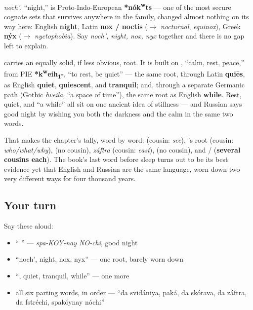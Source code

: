 \begin{cousinweb}
\emph{noch'}, \textquotedblleft{}night,\textquotedblright{} is Proto-Indo-European \textbf{*nók\textsuperscript{w}ts} — one of the most secure cognate sets that survives anywhere in the family, changed almost nothing on its way here: English \textbf{night}, Latin \textbf{nox / noctis} ($\to$ \emph{nocturnal}, \emph{equinox}), Greek \textbf{nýx} ($\to$ \emph{nyctophobia}). Say \emph{noch', night, nox, nyx} together and there is no gap left to explain.

\textbf{} carries an equally solid, if less obvious, root. It is built on \textbf{}, \textquotedblleft{}calm, rest, peace,\textquotedblright{} from PIE \textbf{*k\textsuperscript{w}eih\textsubscript{1}-}, \textquotedblleft{}to rest, be quiet\textquotedblright{} — the same root, through Latin \textbf{quiēs}, as English \textbf{quiet}, \textbf{quiescent}, and \textbf{tranquil}; and, through a separate Germanic path (Gothic \emph{hveila}, \textquotedblleft{}a space of time\textquotedblright{}), the same root as English \textbf{while}. Rest, quiet, and \textquotedblleft{}a while\textquotedblright{} all sit on one ancient idea of stillness — and Russian says good night by wishing you both the darkness and the calm in the same two words.

That makes the chapter's tally, word by word: \emph{} (cousin: \emph{see}), \emph{}'s root (cousin: \emph{who/what/why}), \emph{} (no cousin), \emph{záftra} (cousin: \emph{east}), \emph{} (no cousin), and \emph{} / \emph{} (\textbf{several cousins each}). The book's last word before sleep turns out to be its best evidence yet that English and Russian are the same language, worn down two very different ways for four thousand years.
\end{cousinweb}

\subsection*{Your turn}
Say these aloud:

\begin{itemize}
\raggedright
  \item \textquotedblleft{} \textquotedblright{} — \emph{spa-KOY-nay NO-chi}, good night
  \item \textquotedblleft{}noch', night, nox, nyx\textquotedblright{} — one root, barely worn down
  \item \textquotedblleft{}, quiet, tranquil, while\textquotedblright{} — one more
  \item all six parting words, in order — \textquotedblleft{}da svidániya, paká, da skórava, da záftra, da fstréchi, spakóynay nóchi\textquotedblright{}
\end{itemize}

